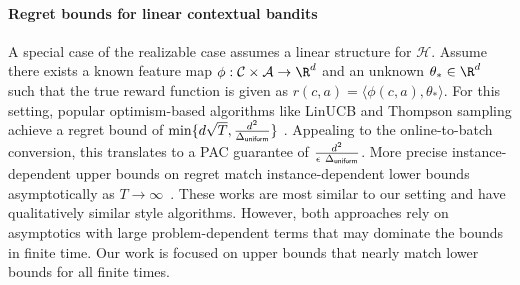 \documentclass{article}
\newcommand{\mc}[1]{\mathcal{#1}}
\newcommand{\kevin}[1]{\textcolor{red}{KGJ:#1}}
\newcommand{\houssam}[1]{\textcolor{magenta}{HN: #1}}
\newcommand{\1}{\mathbf{1}}
\renewcommand{\v}{r} %
\begin{document}

\paragraph{Regret bounds for linear contextual bandits}
A special case of the realizable case assumes a linear structure for $\mc{H}$. Assume there exists a known feature map $\phi : \mc{C} \times \mc{A} \rightarrow \R^d$ and an unknown $\theta_{\ast} \in \R^d$ such that the true reward function is given as $\v(c,a) = \langle \phi(c,a) , \theta_{\ast} \rangle$.
For this setting, popular optimism-based algorithms like LinUCB \cite{li2010contextual} and Thompson sampling \cite{russo2016simple,EBNabi} achieve a regret bound of $\min\{ d\sqrt{T}, \frac{d^2}{\Delta_{\sf uniform}} \}$ \cite{abbasi2011improved}.
Appealing to the online-to-batch conversion, this translates to a PAC guarantee of $\frac{d^2}{\epsilon \ \Delta_{\sf uniform}}$.
More precise instance-dependent upper bounds on regret match instance-dependent lower bounds asymptotically as $T\rightarrow \infty$~\cite{hao2020adaptive,tirinzoni2020asymptotically}. 
These works are most similar to our setting and have qualitatively similar style algorithms. 
However, both approaches rely on asymptotics with large problem-dependent terms that may  dominate the bounds in finite time. 
Our work is focused on upper bounds that nearly match lower bounds for all finite times. \vspace{-10pt}
\end{document}
